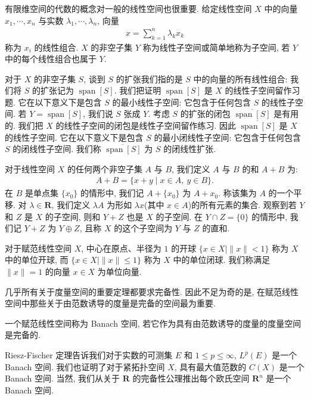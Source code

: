 \documentclass[../../main.tex]{subfiles}
\begin{document}
有限维空间的代数的概念对一般的线性空间也很重要. 给定线性空间 $X$ 中的向量 $x_{1},\cdots,x_{n}$ 与实数 $\lambda_{1},\cdots,\lambda_{n}$, 向量
\begin{align*}
x=\sum_{k=1}^{n}\lambda_{k}x_{k}
\end{align*}
称为 $x_{i}$ 的线性组合. $X$ 的非空子集 $Y$ 称为线性子空间或简单地称为子空间, 若 $Y$ 中的每个线性组合也属于 $Y$.

对于 $X$ 的非空子集 $S$, 谈到 $S$ 的扩张我们指的是 $S$ 中的向量的所有线性组合: 我们将 $S$ 的扩张记为 $\operatorname{span}[S]$. 我们把证明 $\operatorname{span}[S]$ 是 $X$ 的线性子空间留作习题. 它在以下意义下是包含 $S$ 的最小线性子空间: 它包含于任何包含 $S$ 的线性子空间. 若 $Y=\operatorname{span}[S]$, 我们说 $S$ 张成 $Y$. 考虑 $S$ 的扩张的闭包 $\overline{\operatorname{span}[S]}$ 是有用的. 我们把 $X$ 的线性子空间的闭包是线性子空间留作练习. 因此 $\overline{\operatorname{span}[S]}$ 是 $X$ 的线性子空间. 它在以下意义下是包含 $S$ 的最小闭线性子空间: 它包含于任何包含 $S$ 的闭线性子空间. 我们称 $\overline{\operatorname{span}[S]}$ 为 $S$ 的闭线性扩张.

对于线性空间 $X$ 的任何两个非空子集 $A$ 与 $B$, 我们定义 $A$ 与 $B$ 的和 $A+B$ 为:
\begin{align*}
A+B=\{x+y\mid x\in A,\ y\in B\}.
\end{align*}
在 $B$ 是单点集 $\{x_{0}\}$ 的情形中, 我们记 $A+\{x_{0}\}$ 为 $A+x_{0}$. 称该集为 $A$ 的一个平移. 对 $\lambda\in\mathbf{R}$, 我们定义 $\lambda A$ 为形如 $\lambda x$(其中 $x\in A$)的所有元素的集合. 观察到若 $Y$ 和 $Z$ 是 $X$ 的子空间, 则和 $Y+Z$ 也是 $X$ 的子空间. 在 $Y\cap Z=\{0\}$ 的情形中, 我们记 $Y+Z$ 为 $Y\oplus Z$, 且称 $X$ 的这个子空间为 $Y$ 与 $Z$ 的直和.

对于赋范线性空间 $X$, 中心在原点、半径为 $1$ 的开球 $\{x\in X\mid\|x\|<1\}$ 称为 $X$ 中的单位开球, 而 $\{x\in X\mid\|x\|\leqslant 1\}$ 称为 $X$ 中的单位闭球. 我们称满足 $\|x\|=1$ 的向量 $x\in X$ 为单位向量.

几乎所有关于度量空间的重要定理都要求完备性. 因此不足为奇的是, 在赋范线性空间中那些关于由范数诱导的度量是完备的空间最为重要.

\begin{definition}[Banach 空间]\label{definition:ch13-Banach}
一个赋范线性空间称为 Banach 空间, 若它作为具有由范数诱导的度量的度量空间是完备的.
\end{definition}

Riesz-Fischer 定理告诉我们对于实数的可测集 $E$ 和 $1\leqslant p\leqslant\infty$, $L^{p}(E)$ 是一个 Banach 空间. 我们也证明了对于紧拓扑空间 $X$, 具有最大值范数的 $C(X)$ 是一个 Banach 空间. 当然, 我们从关于 $\mathbf{R}$ 的完备性公理推出每个欧氏空间 $\mathbf{R}^{n}$ 是一个 Banach 空间.
\end{document}
